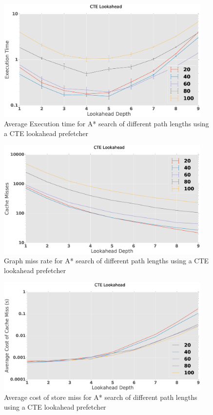 \begin{figure}[htbp]
	\centering
	\includegraphics[width=0.95\textwidth]{figs/prefetch-CTE.eps}
	\caption{Average Execution time for A* search of different path lengths using a CTE lookahead prefetcher}
	\label{fig:prefetch-CTE}
\end{figure}
\begin{figure}[htbp]
	\centering
	\includegraphics[width=0.95\textwidth]{figs/prefetch-misses-CTE.eps}
	\caption{Graph miss rate for A* search of different path lengths using a CTE lookahead prefetcher}
	\label{fig:prefetch-miss-CTE}
\end{figure}
\begin{figure}[htbp]
	\centering
	\includegraphics[width=0.95\textwidth]{figs/prefetch-dbcost-CTE.eps}
	\caption{Average cost of store miss for A* search of different path lengths using a CTE lookahead prefetcher}
	\label{fig:prefetch-dbcost-CTE}
\end{figure}

